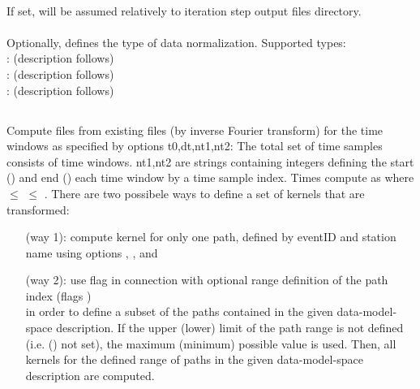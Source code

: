 \paragraph{}
If set,  will be assumed relatively to iteration step output files directory.
\paragraph{}
Optionally,  defines the type of data normalization. Supported types:\\
: (description follows)\\ %
: (description follows)\\ %
: (description follows) %
%
%
\subsection{} \label{programs_scripts,sec:bin_prog,sec:spec_time_kernels}
Compute  files from existing  files (by inverse Fourier transform) 
for the time windows as specified by options t0,dt,nt1,nt2: The total set of time samples consists of 
 time windows. nt1,nt2 are strings containing  integers defining the start () 
and end () each time window by a time sample index. 
Times compute as  where  \(\le\)  \(\le\) .
There are two possibele ways to define a set of kernels that are transformed:
\begin{itemize}
\item[(way 1):] compute kernel for only one path, defined by eventID and station name using options , ,  and 
\item[(way 2):] use flag  in connection with optional range definition of the path index (flags  )\\
in order to define a subset of the paths contained in the given data-model-space description. If the upper (lower) limit of the path range is not defined (i.e.  () not set), the maximum (minimum) possible value is used. Then, all kernels for the defined range of paths in the given data-model-space description are computed.
\end{itemize}
